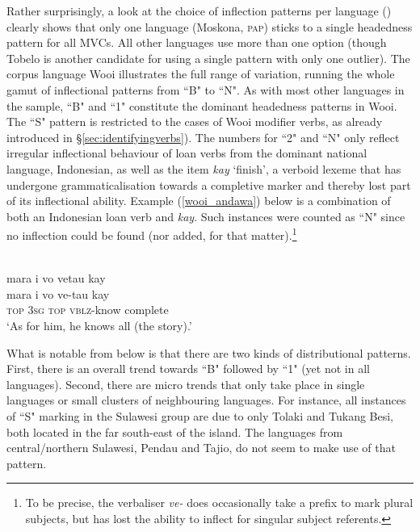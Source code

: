 Rather surprisingly, a look at the choice of inflection patterns per language () clearly shows that only one language (Moskona, \textsc{pap}) sticks to a single headedness pattern for all MVCs. All other languages use more than one option (though Tobelo is another candidate for using a single pattern with only one outlier). The corpus language Wooi illustrates the full range of variation, running the whole gamut of inflectional patterns from ``B" to ``N". As with most other languages in the sample, ``B" and ``1" constitute the dominant headedness patterns in Wooi. The ``S" pattern is restricted to the cases of Wooi modifier verbs, as already introduced in §\ref{sec:identifyingverbs}). The numbers for ``2" and ``N" only reflect irregular inflectional behaviour of loan verbs from the dominant national language, Indonesian, as well as the item \textit{kay} `finish', a verboid lexeme that has undergone grammaticalisation towards a completive marker and thereby lost part of its inflectional ability. Example (\ref{wooi_andawa}) below is a combination of both an Indonesian loan verb and \textit{kay}. Such instances were counted as ``N" since no inflection could be found (nor added, for that matter).\footnote{To be precise, the verbaliser \textit{ve-} does occasionally take a prefix to mark plural subjects, but has lost the ability to inflect for singular subject referents.}

\ea \label{wooi_andawa}
\\
\glll mara i vo vetau kay \\
mara i vo ve-tau kay \\
\textsc{top} \textsc{3}\textsc{sg} \textsc{top} \textsc{vblz}-know complete \\
\glft `As for him, he knows all (the story).' \\ 
\z

What is notable from  below is that there are two kinds of distributional patterns. First, there is an overall trend towards ``B" followed by ``1" (yet not in all languages). Second, there are micro trends that only take place in single languages or small clusters of neighbouring languages. For instance, all instances of ``S" marking in the Sulawesi group are due to only Tolaki and Tukang Besi, both located in the far south-east of the island. The languages from central/northern Sulawesi, Pendau and Tajio, do not seem to make use of that pattern. 

